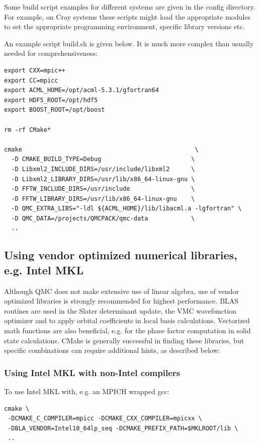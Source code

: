 Some build script examples for different systems are given in the
config directory. For example, on Cray systems these scripts might
load the appropriate modules to set the appropriate programming
environment, specific library versions etc.

An example script build.sh is given below. It is much more complex
than usually needed for comprehensiveness:

\begin{verbatim}
export CXX=mpic++
export CC=mpicc
export ACML_HOME=/opt/acml-5.3.1/gfortran64
export HDF5_ROOT=/opt/hdf5
export BOOST_ROOT=/opt/boost

rm -rf CMake*

cmake                                                \
  -D CMAKE_BUILD_TYPE=Debug                         \
  -D Libxml2_INCLUDE_DIRS=/usr/include/libxml2      \
  -D Libxml2_LIBRARY_DIRS=/usr/lib/x86_64-linux-gnu \
  -D FFTW_INCLUDE_DIRS=/usr/include                 \
  -D FFTW_LIBRARY_DIRS=/usr/lib/x86_64-linux-gnu    \
  -D QMC_EXTRA_LIBS="-ldl ${ACML_HOME}/lib/libacml.a -lgfortran" \
  -D QMC_DATA=/projects/QMCPACK/qmc-data            \
  ..
\end{verbatim}

\subsection{Using vendor optimized numerical libraries, e.g. Intel MKL}
 
Although QMC does not make extensive use of linear algebra, use of
vendor optimized libraries is strongly recommended for highest
performance. BLAS routines are used in the Slater determinant update, the VMC wavefunction optimizer
and to apply orbital coefficients in local basis calculations. Vectorized
math functions are also beneficial, e.g. for the phase factor
computation in solid state calculations. CMake is generally successful
in finding these libraries, but specific combinations can require
additional hints, as described below:

\subsubsection{Using Intel MKL with non-Intel compilers}

To use Intel MKL with, e.g. an MPICH wrapped gcc:
\begin{verbatim}
cmake \
 -DCMAKE_C_COMPILER=mpicc -DCMAKE_CXX_COMPILER=mpicxx \
 -DBLA_VENDOR=Intel10_64lp_seq -DCMAKE_PREFIX_PATH=$MKLROOT/lib \
 ..
\end{verbatim}

